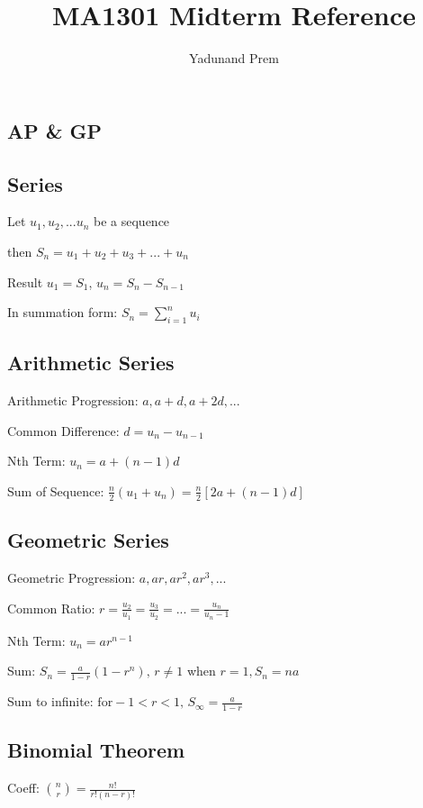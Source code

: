 \documentclass[a4paper,twoside,notitlepage,10pt]{article}
\begin{document}
  
\title{MA1301 Midterm Reference}
\author{Yadunand Prem}
\setlength{\parindent}{0pt}

\begin{landscape}
\begin{multicols}{3}

\section{AP \& GP}

\subsection{Series}

Let $u_1, u_2,... u_n$ be a sequence

then $S_n = u_1 + u_2 + u_3 + ... + u_n$

Result $u_1 = S_1$, $u_n = S_n - S_{n-1}$

In summation form: $S_n = \sum_{i=1}^{n} u_i$

\subsection{Arithmetic Series}

Arithmetic Progression: $a, a+d, a+2d,...$

Common Difference: $d = u_{n} - u_{n-1}$

Nth Term: $u_n=a+(n-1)d$

Sum of Sequence: $\frac{n}{2}(u_1 + u_n) = \frac{n}{2}[2a+(n-1)d]$

\subsection{Geometric Series}

Geometric Progression: $a, ar, ar^2, ar^3,...$

Common Ratio: $r = \frac{u_2}{u_1} = \frac{u_3}{u_2} = ... = \frac{u_n}{u_n-1}$

Nth Term: $u_n = ar^{n-1}$

Sum: $S_n = \frac{a}{1-r}(1-r^n),\, r \neq 1$ when $r = 1, S_n = na$

Sum to infinite: $\text{for}-1 < r < 1, \, S_{\infty} = \frac{a}{1-r}$

\subsection{Binomial Theorem}

Coeff: $\binom{n}{r} = \frac{n!}{r!(n-r)!}$


\end{multicols}
\end{landscape}
\end{document}
